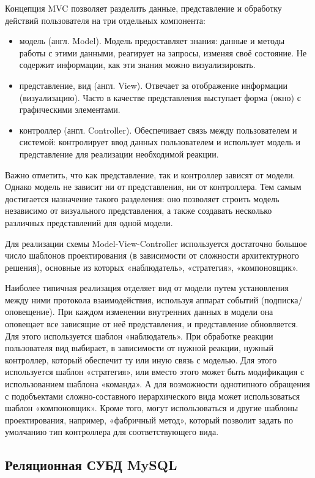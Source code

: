 Концепция MVC позволяет разделить данные, представление и обработку действий пользователя на три отдельных компонента:
\begin{itemize}
    \item модель (англ. Model). Модель предоставляет знания: данные и методы работы с этими данными, реагирует на запросы, изменяя своё состояние. Не содержит информации, как эти знания можно визуализировать.
    \item представление, вид (англ. View). Отвечает за отображение информации (визуализацию). Часто в качестве представления выступает форма (окно) с графическими элементами.
    \item контроллер (англ. Controller). Обеспечивает связь между пользователем и системой: контролирует ввод данных пользователем и использует модель и представление для реализации необходимой реакции.
\end{itemize}

Важно отметить, что как представление, так и контроллер зависят от модели. Однако модель не зависит ни от представления, ни от контроллера. Тем самым достигается назначение такого разделения: оно позволяет строить модель независимо от визуального представления, а также создавать несколько различных представлений для одной модели.

Для реализации схемы Model-View-Controller используется достаточно большое число шаблонов проектирования (в зависимости от сложности архитектурного решения), основные из которых «наблюдатель», «стратегия», «компоновщик».

Наиболее типичная реализация отделяет вид от модели путем установления между ними протокола взаимодействия, используя аппарат событий (подписка/оповещение). При каждом изменении внутренних данных в модели она оповещает все зависящие от неё представления, и представление обновляется. Для этого используется шаблон «наблюдатель». При обработке реакции пользователя вид выбирает, в зависимости от нужной реакции, нужный контроллер, который обеспечит ту или иную связь с моделью. Для этого используется шаблон «стратегия», или вместо этого может быть модификация с использованием шаблона «команда». А для возможности однотипного обращения с подобъектами сложно-составного иерархического вида может использоваться шаблон «компоновщик». Кроме того, могут использоваться и другие шаблоны проектирования, например, «фабричный метод», который позволит задать по умолчанию тип контроллера для соответствующего вида.

\subsection{Реляционная СУБД MySQL}

